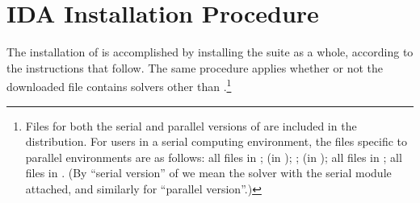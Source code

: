 \chapter{IDA Installation Procedure}\label{s:install}

The installation of {\ida} is accomplished by installing the
{\sundials} suite as a whole, according to the instructions that
follow.   The same procedure applies whether or not the downloaded
file contains solvers other than {\ida}.\footnote{Files for both the
serial and parallel versions of {\ida} are included in the distribution.
For users in a serial computing environment, the files specific to parallel
environments are as follows:
all files in ;
 (in );
; 
 (in );
all files in ;
all files in .
(By ``serial version'' of {\ida} we mean the {\ida} solver with the
serial {\nvector} module attached, and similarly for ``parallel version''.)}


